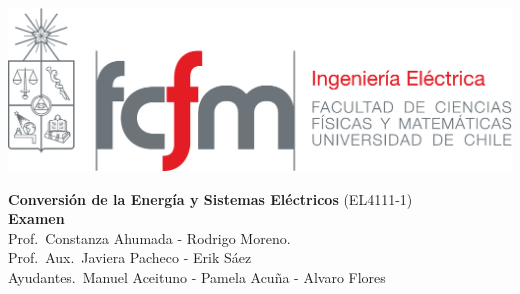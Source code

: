 \documentclass[
  11pt,
  letterpaper,
   addpoints,
   answers
  ]{exam}
\begin{document}
\noindent
\begin{minipage}{0.47\textwidth}
\includegraphics[width=\textwidth]{../fcfm_die}
\end{minipage}
\begin{minipage}{0.53\textwidth}
\begin{center} 
\large\textbf{Conversión de la Energía y Sistemas Eléctricos } (EL4111-1) \\
\large\textbf{Examen} \\
\small Prof.~Constanza Ahumada - Rodrigo Moreno.\\
\small Prof.~Aux.~Javiera Pacheco - Erik Sáez\\
\small Ayudantes.~Manuel Aceituno - Pamela Acuña - Alvaro Flores\\
\end{center}
\end{minipage}

\vspace{0.5cm}
\noindent
\vspace{.85cm}
\end{document}
